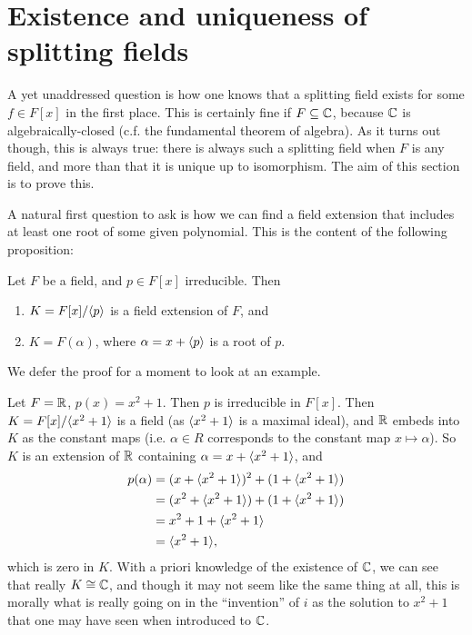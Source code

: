 \section{Existence and uniqueness of splitting fields}

A yet unaddressed question is how one knows that a splitting field exists for some $f \in F[x]$ in the first place. This is certainly fine if $F \subseteq \mathbb{{C}}$, because $\mathbb{{C}}$ is algebraically-closed (c.f. the fundamental theorem of algebra). As it turns out though, this is always true: there is always such a splitting field when $F$ is any field, and more than that it is unique up to isomorphism. The aim of this section is to prove this.

A natural first question to ask is how we can find a field extension that includes at least one root of some given polynomial. This is the content of the following proposition:

\begin{proposition}
\label{prop_exists_field_ext_containing_root}
    Let $F$ be a field, and $p \in F[x]$ irreducible. Then
    \begin{enumerate}[label=(\alph*)]
        \item $K = F[x]/\langle {p} \rangle$ is a field extension of $F$, and
        \item $K = F(\alpha)$, where $\alpha = x + \langle {p} \rangle$ is a root of $p$.
    \end{enumerate}
\end{proposition}

We defer the proof for a moment to look at an example.

\begin{example}
\label{exmp_quot_const_of_c}
    Let $F = \mathbb{{R}}$, $p(x) = x^2 + 1$. Then $p$ is irreducible in $F[x]$. Then
    $K = F[x]/\langle {x^2 + 1} \rangle$ is a field (as $\langle {x^2 + 1} \rangle$ is a maximal ideal), and $\mathbb{{R}}$ embeds into $K$ as the constant maps (i.e. $\alpha \in R$ corresponds to the constant map $x \longmapsto \alpha$). So $K$ is an extension of $\mathbb{{R}}$ containing $\alpha = x + \langle {x^2 + 1} \rangle$, and
    \begin{align*}
        p(\alpha)
        &= (x + \langle {x^2 + 1} \rangle)^2 + (1 + \langle {x^2 + 1} \rangle) \\
        &= (x^2 + \langle {x^2 + 1} \rangle) + (1 + \langle {x^2 + 1} \rangle) \\
        &= x^2 + 1 + \langle {x^2 + 1} \rangle \\
        &= \langle {x^2 + 1} \rangle,
    \end{align*}
    which is zero in $K$. With a priori knowledge of the existence of $\mathbb{{C}}$, we can see that really $K \cong \mathbb{{C}}$, and though it may not seem like the same thing at all, this is morally what is really going on in the ``invention'' of $i$ as the solution to $x^2 + 1$ that one may have seen when introduced to $\mathbb{{C}}$.
\end{example}

